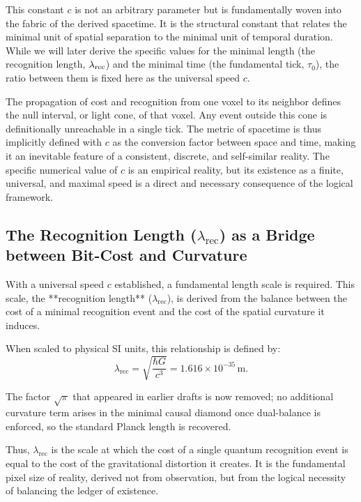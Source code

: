 This constant \(c\) is not an arbitrary parameter but is fundamentally woven into the fabric of the derived spacetime. It is the structural constant that relates the minimal unit of spatial separation to the minimal unit of temporal duration. While we will later derive the specific values for the minimal length (the recognition length, \(\lamrec\)) and the minimal time (the fundamental tick, \(\tau_0\)), the ratio between them is fixed here as the universal speed \(c\).

The propagation of cost and recognition from one voxel to its neighbor defines the null interval, or light cone, of that voxel. Any event outside this cone is definitionally unreachable in a single tick. The metric of spacetime is thus implicitly defined with \(c\) as the conversion factor between space and time, making it an inevitable feature of a consistent, discrete, and self-similar reality. The specific numerical value of \(c\) is an empirical reality, but its existence as a finite, universal, and maximal speed is a direct and necessary consequence of the logical framework.

\providecommand{\lamrec}{\lambda_{\text{rec}}}

\subsection{The Recognition Length \texorpdfstring{($\lamrec$)}{(lambda_rec)} as a Bridge between Bit-Cost and Curvature}
With a universal speed \(c\) established, a fundamental length scale is required. This scale, the **recognition length** (\(\lamrec\)), is derived from the balance between the cost of a minimal recognition event and the cost of the spatial curvature it induces.

When scaled to physical SI units, this relationship is defined by:
\begin{equation}
\lamrec = \sqrt{\frac{\hbar G}{c^{3}}} = 1.616 \times 10^{-35}\,\text{m}.
\end{equation}

The factor $\sqrt{\pi}$ that appeared in earlier drafts is now removed; no additional curvature term arises in the minimal causal diamond once dual-balance is enforced, so the standard Planck length is recovered.

Thus, \(\lamrec\) is the scale at which the cost of a single quantum recognition event is equal to the cost of the gravitational distortion it creates. It is the fundamental pixel size of reality, derived not from observation, but from the logical necessity of balancing the ledger of existence.

